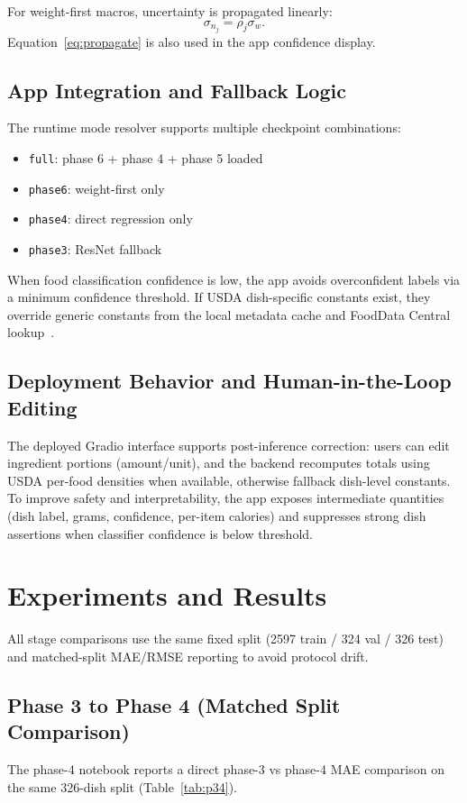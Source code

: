 \documentclass[10pt,twocolumn,letterpaper]{article}
\begin{document}
For weight-first macros, uncertainty is propagated linearly:
\begin{equation}
\sigma_{n_j}=\rho_j\sigma_w.
\label{eq:propagate}
\end{equation}
Equation~\eqref{eq:propagate} is also used in the app confidence display.

\subsection{App Integration and Fallback Logic}
The runtime mode resolver supports multiple checkpoint combinations:
\begin{itemize}
\item \texttt{full}: phase 6 + phase 4 + phase 5 loaded
\item \texttt{phase6}: weight-first only
\item \texttt{phase4}: direct regression only
\item \texttt{phase3}: ResNet fallback
\end{itemize}
When food classification confidence is low, the app avoids overconfident labels via a minimum confidence threshold. If USDA dish-specific constants exist, they override generic constants from the local metadata cache and FoodData Central lookup~\cite{usdafdc}.

\subsection{Deployment Behavior and Human-in-the-Loop Editing}
The deployed Gradio interface supports post-inference correction: users can edit ingredient portions (amount/unit), and the backend recomputes totals using USDA per-food densities when available, otherwise fallback dish-level constants. To improve safety and interpretability, the app exposes intermediate quantities (dish label, grams, confidence, per-item calories) and suppresses strong dish assertions when classifier confidence is below threshold.

\section{Experiments and Results}
All stage comparisons use the same fixed split (2597 train / 324 val / 326 test) and matched-split MAE/RMSE reporting to avoid protocol drift.

\subsection{Phase 3 to Phase 4 (Matched Split Comparison)}
The phase-4 notebook reports a direct phase-3 vs phase-4 MAE comparison on the same 326-dish split (Table~\ref{tab:p34}).
\end{document}
